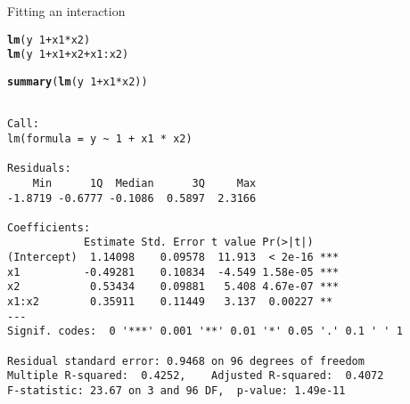 \documentclass[10pt]{beamer}\usepackage[]{graphicx}\usepackage[]{color}
\makeatletter
\newcommand{\hlnum}[1]{\textcolor[rgb]{0.686,0.059,0.569}{#1}}%
\newcommand{\hlopt}[1]{\textcolor[rgb]{0,0,0}{#1}}%
\newcommand{\hlstd}[1]{\textcolor[rgb]{0.345,0.345,0.345}{#1}}%
\newcommand{\hlkwd}[1]{\textcolor[rgb]{0.737,0.353,0.396}{\textbf{#1}}}%
\newenvironment{kframe}{%
 \def\at@end@of@kframe{}%
 \ifinner\ifhmode%
  \def\at@end@of@kframe{\end{minipage}}%
  \begin{minipage}{\columnwidth}%
 \fi\fi%
 \def\FrameCommand##1{\hskip\@totalleftmargin \hskip-\fboxsep
 \colorbox{shadecolor}{##1}\hskip-\fboxsep
     \hskip-\linewidth \hskip-\@totalleftmargin \hskip\columnwidth}%
 \MakeFramed {\advance\hsize-\width
   \@totalleftmargin\z@ \linewidth\hsize
   \@setminipage}}%
 {\par\unskip\endMakeFramed%
 \at@end@of@kframe}
\newenvironment{knitrout}{}{} %
\makeatother
\begin{document}
\begin{frame}[fragile]{Fitting an interaction}


\begin{knitrout}\small
{}\color{fgcolor}\begin{kframe}
\begin{alltt}
  \hlkwd{lm}\hlstd{(y} \hlopt{~} \hlnum{1} \hlopt{+} \hlstd{x1} \hlopt{*} \hlstd{x2)}
  \hlkwd{lm}\hlstd{(y} \hlopt{~} \hlnum{1} \hlopt{+} \hlstd{x1} \hlopt{+} \hlstd{x2} \hlopt{+} \hlstd{x1}\hlopt{:}\hlstd{x2)}
\end{alltt}
\end{kframe}
\end{knitrout}
  \pause
\begin{knitrout}\small
{}\color{fgcolor}\begin{kframe}
\begin{alltt}
  \hlkwd{summary}\hlstd{(}\hlkwd{lm}\hlstd{(y}\hlopt{~} \hlnum{1} \hlopt{+} \hlstd{x1}\hlopt{*}\hlstd{x2))}
\end{alltt}
\begin{verbatim}

Call:
lm(formula = y ~ 1 + x1 * x2)

Residuals:
    Min      1Q  Median      3Q     Max 
-1.8719 -0.6777 -0.1086  0.5897  2.3166 

Coefficients:
            Estimate Std. Error t value Pr(>|t|)    
(Intercept)  1.14098    0.09578  11.913  < 2e-16 ***
x1          -0.49281    0.10834  -4.549 1.58e-05 ***
x2           0.53434    0.09881   5.408 4.67e-07 ***
x1:x2        0.35911    0.11449   3.137  0.00227 ** 
---
Signif. codes:  0 '***' 0.001 '**' 0.01 '*' 0.05 '.' 0.1 ' ' 1

Residual standard error: 0.9468 on 96 degrees of freedom
Multiple R-squared:  0.4252,	Adjusted R-squared:  0.4072 
F-statistic: 23.67 on 3 and 96 DF,  p-value: 1.49e-11
\end{verbatim}
\end{kframe}
\end{knitrout}
\end{frame}
\end{document}
